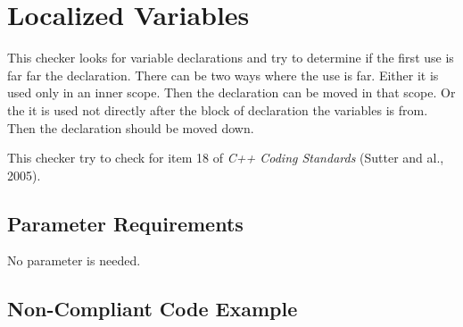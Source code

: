 %
%

\section{Localized Variables}
\label{LocalizedVariables::overview}

This checker looks for variable declarations and try to determine if
the first use is far far the declaration. There can be two ways where
the use is far. Either it is used only in an inner scope. Then the
declaration can be moved in that scope. Or the it is used not directly
after the block of declaration the variables is from. Then the
declaration should be moved down.

This checker try to check for item 18 of \emph{C++ Coding Standards}
(Sutter and al., 2005).

\subsection{Parameter Requirements}

   No parameter is needed.

\subsection{Non-Compliant Code Example}

